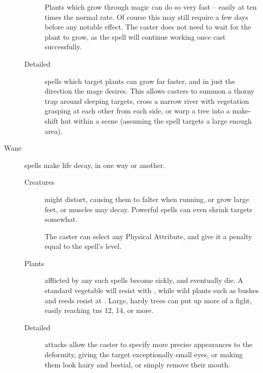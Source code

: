 \begin{multicols}{2}
\begin{description}
\begin{description}
        Plants which grow through magic can do so very fast -- easily at ten times the normal rate.
        Of course this may still require a few days before any notable effect.
        The caster does not need to wait for the plant to grow, as the spell will continue working once cast successfully.
      \item[Detailed]
        spells which target plants can grow far faster, and in just the direction the mage desires.
        This allows casters to summon a thorny trap around sleeping targets, cross a narrow river with vegetation grasping at each other from each side, or warp a tree into a make-shift hut within a scene (assuming the spell targets a large enough area).
    \end{description}
  \item[Wane]
  spells make life decay, in one way or another.
    \begin{description}
      \item[Creatures]
        might distort, causing them to falter when running, or grow large feet, or muscles may decay.
        Powerful spells can even shrink targets somewhat.

        The caster can select any Physical Attribute, and give it a penalty equal to the spell's level.
      \item[Plants]
        afflicted by any such spells become sickly, and eventually die.
        A standard vegetable will resist with \tn[4], while wild plants such as bushes and reeds resist at \tn[7].
        Large, hardy trees can put up more of a fight, easily reaching \glspl{tn} 12, 14, or more.
      \item[Detailed]
        attacks allow the caster to specify more precise appearances to the deformity, giving the target exceptionally small eyes, or making them look hairy and bestial, or simply remove their mouth.


\end{description}
\end{description}
\end{multicols}
